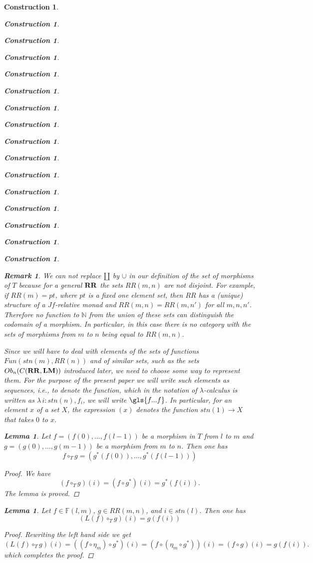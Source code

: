 \documentclass[onecolumn,12pt]{amsart}
\newtheorem{lemma}[proposition]{Lemma}
\newtheorem{remark}[proposition]{Remark}
\numberwithin{proposition}{subsection}
\newtheorem{construction}[proposition]{Construction}
\newcommand{\sr}{\rightarrow}
\newcommand{\nn}{{\mathbb N}}
\newcommand{\nat}{\nn}
\newcommand{\mbind}[1]{{#1^*}}
\newcommand{\hc}{\circ_{T}}
\newcommand{\RR}{{\bf RR}}
\newcommand{\LM}{{\bf LM}}
\newcommand{\FF}{{\mathbb F}}
\begin{document}
\begin{construction}
\begin{construction}
\begin{construction}
\begin{construction}
\begin{construction}
\begin{construction}
\begin{construction}
\begin{construction}
\begin{construction}
\begin{construction}
\begin{construction}
\begin{construction}
\begin{construction}
\begin{construction}
\begin{construction}
\begin{construction}
%
\begin{remark}\rm
\label{2015.11.20.rem4} 
We can not replace $\amalg$ by $\cup$ in our
definition of the set of morphisms of $T$ because for a general $\RR$ the sets
$RR(m,n)$ are not disjoint.  For example, if $RR(m)=pt$, where $pt$ is a fixed
one element set, then $RR$ has a (unique) structure of a $Jf$-relative monad and
$RR(m,n)=RR(m,n')$ for all $m,n,n'$. Therefore no function to $\nat$ from the
union of these sets can distinguish the codomain of a morphism. In particular,
in this case there is no category with the sets of morphisms from $m$ to $n$
being equal to $RR(m,n)$.
\end{remark}
%
Since we will have to deal with elements of the sets of functions
$Fun(stn(m),RR(n))$ and of similar sets, such as the sets $Ob_n(C(\RR,\LM))$
introduced later, we need to choose some way to represent them. For the purpose
of the present paper we will write such elements as sequences, i.e., to denote
the function, which in the notation of $\lambda$-calculus is written as
$\lambda\,i:stn(n), f_i$, we will write $\gls{f...f}$. In particular,
for an element $x$ of a set $X$, the expression $(x)$ denotes the function
$stn(1)\sr X$ that takes $0$ to $x$.
%
\begin{lemma}
\label{2016.01.15.l4} 
Let $f=(f(0),\dots,f(l-1))$ be a morphism in $T$ from
$l$ to $m$ and $g=(g(0),\dots,g(m-1))$ be a morphism from $m$ to $n$. Then one has
%
$$f\hc g=(\mbind{g}(f(0)),\dots,\mbind{g}(f(l-1)))$$
%
\end{lemma}
%
\begin{proof}
We have
%
$$(f\hc g)(i)=(f\circ\mbind{g})(i)=\mbind{g}(f(i)).$$
%
The lemma is proved. 
\end{proof}
%
\begin{lemma}
\label{2015.08.30.l1}
Let $f\in \FF(l,m)$, $g\in RR(m,n)$, and $i\in stn(l)$. Then one has
%
\begin{equation}\label{2015.08.26.eq4}
(L(f)\hc g)(i)=g(f(i))
\end{equation}%
% 
\end{lemma}
%
\begin{proof}
Rewriting the left hand side we get 
%
$$(L(f)\hc g)(i)=((f\circ \eta_{m})\circ \mbind{g})(i)=(f\circ (\eta_{m}\circ \mbind{g}))(i)=(f\circ g)(i)=g(f(i)).$$
%
which completes the proof. 

\end{proof}
\end{construction}
\end{construction}
\end{construction}
\end{construction}
\end{construction}
\end{construction}
\end{construction}
\end{construction}
\end{construction}
\end{construction}
\end{construction}
\end{construction}
\end{construction}
\end{construction}
\end{construction}
\end{construction}
\end{document}
